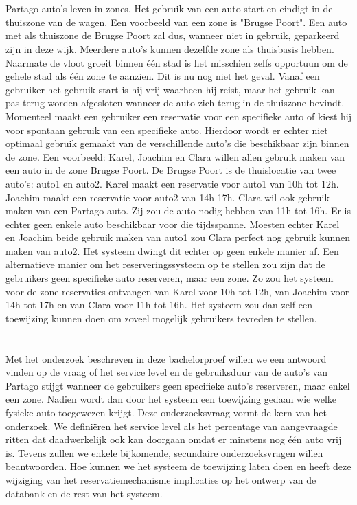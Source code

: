 \section{}
\label{sec:probleemstelling}
Partago-auto's leven in zones. Het gebruik van een auto start en eindigt in de thuiszone van de wagen. Een voorbeeld van een zone is "Brugse Poort". Een auto met als thuiszone de Brugse Poort zal dus, wanneer niet in gebruik, geparkeerd zijn in deze wijk. Meerdere auto's kunnen dezelfde zone als thuisbasis hebben. Naarmate de vloot groeit binnen één stad is het misschien zelfs opportuun om de gehele stad als één zone te aanzien. Dit is nu nog niet het geval. Vanaf een gebruiker het gebruik start is hij vrij waarheen hij reist, maar het gebruik kan pas terug worden afgesloten wanneer de auto zich terug in de thuiszone bevindt. Momenteel maakt een gebruiker een reservatie voor een specifieke auto of kiest hij voor spontaan gebruik van een specifieke auto. Hierdoor wordt er echter niet optimaal gebruik gemaakt van de verschillende auto's die beschikbaar zijn binnen de zone. Een voorbeeld: Karel, Joachim en Clara willen allen gebruik maken van een auto in de zone Brugse Poort. De Brugse Poort is de thuislocatie van twee auto's: auto1 en auto2. Karel maakt een reservatie voor auto1 van 10h tot 12h. Joachim maakt een reservatie voor auto2 van 14h-17h. Clara wil ook gebruik maken van een Partago-auto. Zij zou de auto nodig hebben van 11h tot 16h. Er is echter geen enkele auto beschikbaar voor die tijdsspanne. Moesten echter Karel en Joachim beide gebruik maken van auto1 zou Clara perfect nog gebruik kunnen maken van auto2. Het systeem dwingt dit echter op geen enkele manier af. Een alternatieve manier om het reserveringssysteem op te stellen zou zijn dat de gebruikers geen specifieke auto reserveren, maar een zone. Zo zou het systeem voor de zone reservaties ontvangen van Karel voor 10h tot 12h, van Joachim voor 14h tot 17h en van Clara voor 11h tot 16h. Het systeem zou dan zelf een toewijzing kunnen doen om zoveel mogelijk gebruikers tevreden te stellen.

\section{}
\label{sec:onderzoeksvraag}

Met het onderzoek beschreven in deze bachelorproef willen we een antwoord vinden op de vraag of het service level en de gebruiksduur van de auto's van Partago stijgt wanneer de gebruikers geen specifieke auto's reserveren, maar enkel een zone. Nadien wordt dan door het systeem een toewijzing gedaan wie welke fysieke auto toegewezen krijgt. Deze onderzoeksvraag vormt de kern van het onderzoek. We definiëren het service level als het percentage van aangevraagde ritten dat daadwerkelijk ook kan doorgaan omdat er minstens nog één auto vrij is. Tevens zullen we enkele bijkomende, secundaire onderzoeksvragen willen beantwoorden. Hoe kunnen we het systeem de toewijzing laten doen en heeft deze wijziging van het reservatiemechanisme implicaties op het ontwerp van de databank en de rest van het systeem.


